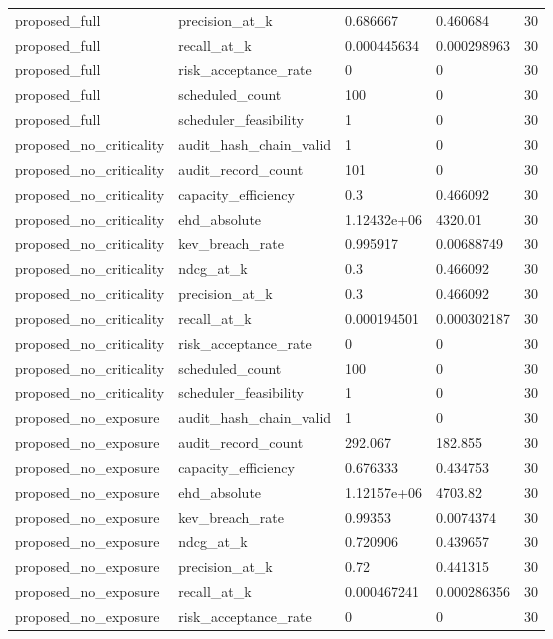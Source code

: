 \begin{tabular}{l l l l l}
proposed\_full & precision\_at\_k & 0.686667 & 0.460684 & 30 \\
proposed\_full & recall\_at\_k & 0.000445634 & 0.000298963 & 30 \\
proposed\_full & risk\_acceptance\_rate & 0 & 0 & 30 \\
proposed\_full & scheduled\_count & 100 & 0 & 30 \\
proposed\_full & scheduler\_feasibility & 1 & 0 & 30 \\
proposed\_no\_criticality & audit\_hash\_chain\_valid & 1 & 0 & 30 \\
proposed\_no\_criticality & audit\_record\_count & 101 & 0 & 30 \\
proposed\_no\_criticality & capacity\_efficiency & 0.3 & 0.466092 & 30 \\
proposed\_no\_criticality & ehd\_absolute & 1.12432e+06 & 4320.01 & 30 \\
proposed\_no\_criticality & kev\_breach\_rate & 0.995917 & 0.00688749 & 30 \\
proposed\_no\_criticality & ndcg\_at\_k & 0.3 & 0.466092 & 30 \\
proposed\_no\_criticality & precision\_at\_k & 0.3 & 0.466092 & 30 \\
proposed\_no\_criticality & recall\_at\_k & 0.000194501 & 0.000302187 & 30 \\
proposed\_no\_criticality & risk\_acceptance\_rate & 0 & 0 & 30 \\
proposed\_no\_criticality & scheduled\_count & 100 & 0 & 30 \\
proposed\_no\_criticality & scheduler\_feasibility & 1 & 0 & 30 \\
proposed\_no\_exposure & audit\_hash\_chain\_valid & 1 & 0 & 30 \\
proposed\_no\_exposure & audit\_record\_count & 292.067 & 182.855 & 30 \\
proposed\_no\_exposure & capacity\_efficiency & 0.676333 & 0.434753 & 30 \\
proposed\_no\_exposure & ehd\_absolute & 1.12157e+06 & 4703.82 & 30 \\
proposed\_no\_exposure & kev\_breach\_rate & 0.99353 & 0.0074374 & 30 \\
proposed\_no\_exposure & ndcg\_at\_k & 0.720906 & 0.439657 & 30 \\
proposed\_no\_exposure & precision\_at\_k & 0.72 & 0.441315 & 30 \\
proposed\_no\_exposure & recall\_at\_k & 0.000467241 & 0.000286356 & 30 \\
proposed\_no\_exposure & risk\_acceptance\_rate & 0 & 0 & 30 \\

\end{tabular}
